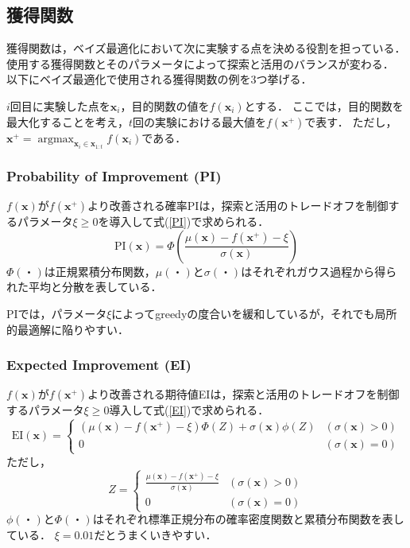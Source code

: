 \documentclass[a4paper,11pt]{jarticle}
\DeclareMathOperator*{\argmax}{argmax}
\begin{document}
\subsection{獲得関数}
獲得関数は，ベイズ最適化において次に実験する点を決める役割を担っている．使用する獲得関数とそのパラメータによって探索と活用のバランスが変わる．
以下にベイズ最適化で使用される獲得関数の例を3つ挙げる．

$i$回目に実験した点を$\mathbf{x}_i$，目的関数の値を$f(\mathbf{x}_i)$とする．
ここでは，目的関数を最大化することを考え，$t$回の実験における最大値を$f(\mathbf{x}^+)$で表す．
ただし，$\mathbf{x}^+ = \argmax_{\mathbf{x}_i \in \mathbf{x}_{1:t}} f(\mathbf{x}_i)$である．

\subsubsection{Probability of Improvement (PI)}
$f(\mathbf{x})$が$f(\mathbf{x}^+)$より改善される確率PIは，探索と活用のトレードオフを制御するパラメータ$\xi\geq0$を導入して式(\ref{PI})で求められる．
\begin{equation}
  \text{PI}(\mathbf{x})=\Phi \left(\frac{\mu(\mathbf{x})-f(\mathbf{x}^+)-\xi}{\sigma(\mathbf{x})}\right) \label{PI}
\end{equation}
$\Phi(・)$は正規累積分布関数，$\mu(・)$と$\sigma(・)$はそれぞれガウス過程から得られた平均と分散を表している．

PIでは，パラメータ$\xi$によってgreedyの度合いを緩和しているが，それでも局所的最適解に陥りやすい．

\subsubsection{Expected Improvement (EI)}
$f(\mathbf{x})$が$f(\mathbf{x}^+)$より改善される期待値EIは，探索と活用のトレードオフを制御するパラメータ$\xi\geq0$導入して式(\ref{EI})で求められる．
\begin{equation}
  \text{EI}(\mathbf{x}) = \left \{
  \begin{array}{ll}
    (\mu(\mathbf{x})-f(\mathbf{x}^+)-\xi)\Phi(Z) + \sigma(\mathbf{x})\phi(Z) & (\sigma(\mathbf{x}) > 0) \\
    0 & (\sigma(\mathbf{x}) = 0) \label{EI}
  \end{array}
  \right.
\end{equation}
ただし，
$$
  Z = \left \{
  \begin{array}{ll}
    \frac{\mu(\mathbf{x})-f(\mathbf{x}^+)-\xi}{\sigma(\mathbf{x})} & (\sigma(\mathbf{x}) > 0) \\
    0 & (\sigma(\mathbf{x}) = 0)
  \end{array}
  \right.
$$
$\phi(・)$と$\Phi(・)$はそれぞれ標準正規分布の確率密度関数と累積分布関数を表している．
$\xi=0.01$だとうまくいきやすい\cite{Lizotte:2008:PBO:1626686}．
\end{document}

